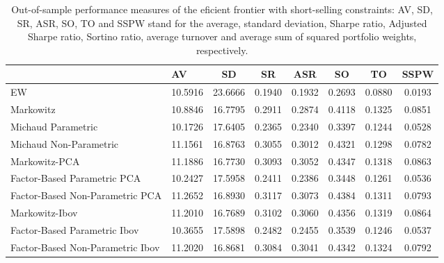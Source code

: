 \begin{table}

\caption{\label{tab:empirical_ef_2}Out-of-sample performance measures of the eficient frontier with short-selling constraints: AV, SD, SR, ASR, SO, TO and SSPW stand for the average, standard deviation, Sharpe ratio, Adjusted Sharpe ratio, Sortino ratio, average turnover and average sum of squared portfolio weights, respectively.}
\centering
\begin{tabular}[t]{l|l|c|c|c|c|c|c}
\hline
  & AV & SD & SR & ASR & SO & TO & SSPW\\
\hline
EW & 10.5916 & 23.6666 & 0.1940 & 0.1932 & 0.2693 & 0.0880 & 0.0193\\
\hline
Markowitz & 10.8846 & 16.7795 & 0.2911 & 0.2874 & 0.4118 & 0.1325 & 0.0851\\
\hline
Michaud Parametric & 10.1726 & 17.6405 & 0.2365 & 0.2340 & 0.3397 & 0.1244 & 0.0528\\
\hline
Michaud Non-Parametric & 11.1561 & 16.8763 & 0.3055 & 0.3012 & 0.4321 & 0.1298 & 0.0782\\
\hline
Markowitz-PCA & 11.1886 & 16.7730 & 0.3093 & 0.3052 & 0.4347 & 0.1318 & 0.0863\\
\hline
Factor-Based Parametric PCA & 10.2427 & 17.5958 & 0.2411 & 0.2386 & 0.3448 & 0.1261 & 0.0536\\
\hline
Factor-Based Non-Parametric PCA & 11.2652 & 16.8930 & 0.3117 & 0.3073 & 0.4384 & 0.1311 & 0.0793\\
\hline
Markowitz-Ibov & 11.2010 & 16.7689 & 0.3102 & 0.3060 & 0.4356 & 0.1319 & 0.0864\\
\hline
Factor-Based Parametric Ibov & 10.3655 & 17.5898 & 0.2482 & 0.2455 & 0.3539 & 0.1246 & 0.0537\\
\hline
Factor-Based Non-Parametric Ibov & 11.2020 & 16.8681 & 0.3084 & 0.3041 & 0.4342 & 0.1324 & 0.0792\\
\hline
\end{tabular}
\end{table}
